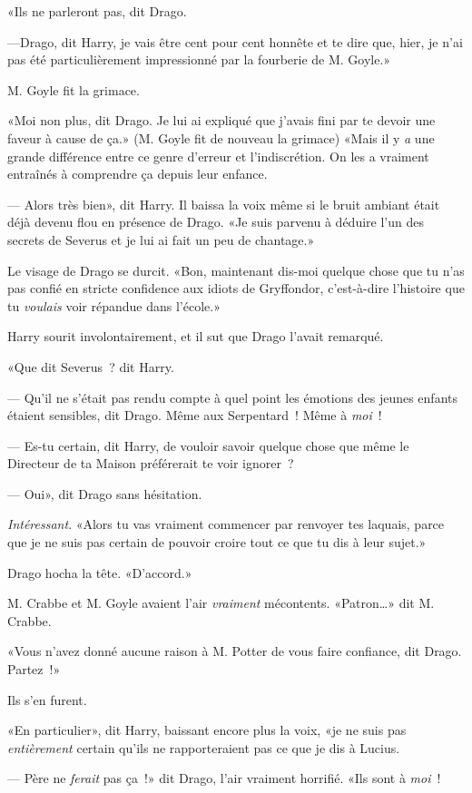 «Ils ne parleront pas, dit Drago.

---Drago, dit Harry, je vais être cent pour cent honnête et te dire que, hier, je n'ai pas été particulièrement impressionné par la fourberie de M. Goyle.»

M. Goyle fit la grimace.

«Moi non plus, dit Drago. Je lui ai expliqué que j'avais fini par te devoir une faveur à cause de ça.» (M. Goyle fit de nouveau la grimace) «Mais il y \emph{a} une grande différence entre ce genre d'erreur et l'indiscrétion. On les a vraiment entraînés à comprendre ça depuis leur enfance.

--- Alors très bien», dit Harry. Il baissa la voix même si le bruit ambiant était déjà devenu flou en présence de Drago. «Je suis parvenu à déduire l'un des secrets de Severus et je lui ai fait un peu de chantage.»

Le visage de Drago se durcit. «Bon, maintenant dis-moi quelque chose que tu n'as pas confié en stricte confidence aux idiots de Gryffondor, c'est-à-dire l'histoire que tu \emph{voulais} voir répandue dans l'école.»

Harry sourit involontairement, et il sut que Drago l'avait remarqué.

«Que dit Severus~? dit Harry.

--- Qu'il ne s'était pas rendu compte à quel point les émotions des jeunes enfants étaient sensibles, dit Drago. Même aux Serpentard~! Même à \emph{moi}~!

--- Es-tu certain, dit Harry, de vouloir savoir quelque chose que même le Directeur de ta Maison préférerait te voir ignorer~?

--- Oui», dit Drago sans hésitation.

\emph{Intéressant}. «Alors tu vas vraiment commencer par renvoyer tes laquais, parce que je ne suis pas certain de pouvoir croire tout ce que tu dis à leur sujet.»

Drago hocha la tête. «D'accord.»

M. Crabbe et M. Goyle avaient l'air \emph{vraiment} mécontents. «Patron…» dit M. Crabbe.

«Vous n'avez donné aucune raison à M. Potter de vous faire confiance, dit Drago. Partez~!»

Ils s'en furent.

«En particulier», dit Harry, baissant encore plus la voix, «je ne suis pas \emph{entièrement} certain qu'ils ne rapporteraient pas ce que je dis à Lucius.

--- Père ne \emph{ferait} pas ça~!» dit Drago, l'air vraiment horrifié. «Ils sont à \emph{moi}~!

